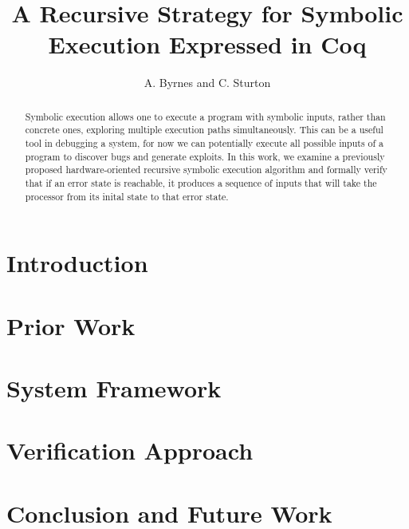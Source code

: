 \documentclass[a4paper]{article}
\title{A Recursive Strategy for Symbolic Execution Expressed in Coq}
\author{A. Byrnes and C. Sturton}
\begin{document}
\maketitle

\begin{abstract}
Symbolic execution allows one to execute a program with symbolic inputs, rather
than concrete ones, exploring multiple execution paths simultaneously. This can
be a useful tool in debugging a system, for now we can potentially execute all
possible inputs of a program to discover bugs and generate exploits. In this
work, we examine a previously proposed hardware-oriented recursive symbolic
execution algorithm and formally verify that if an error state is reachable, it
produces a sequence of inputs that will take the processor from its inital state
to that error state. \cite{test}
\end{abstract}

\section{Introduction}
\section{Prior Work}
\section{System Framework}
\section{Verification Approach}
\section{Conclusion and Future Work}






\end{document}
